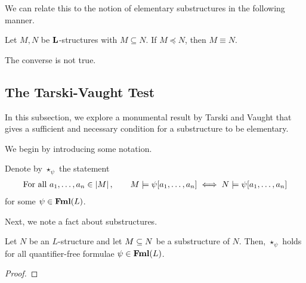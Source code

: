 We can relate this to the notion of elementary substructures in the following manner.

\begin{boxtheorem}
    Let $M, N$ be $\mathbf{L}$-structures with $M \subseteq N$. If $M \preceq N$, then $M \equiv N$.
\end{boxtheorem}

The converse is not true.

\begin{boxcexample}
    \sorry
\end{boxcexample}

\subsection{The Tarski-Vaught Test}

In this subsection, we explore a monumental result by Tarski and Vaught that gives a sufficient and necessary condition for a substructure to be elementary.

We begin by introducing some notation.

\begin{boxlnotation}
    Denote by $\star_{\psi}$ the statement
    \begin{align}
        \text{For all } a_1, \ldots, a_n \in \left\lvert M \right\rvert,
        \qquad
        M \models \psi\!\left[ a_1, \ldots, a_n \right]
        \iff
        N \models \psi\!\left[ a_1, \ldots, a_n \right]
    \end{align}
    for some $\psi \in \mathbf{Fml}(L)$.
\end{boxlnotation}

Next, we note a fact about substructures.

\begin{boxlemma}\label{Ch1:Lemma:Tarski-Vaught-star-psi}
    Let $N$ be an $L$-structure and let $M \subseteq N$ be a substructure of $N$. Then, $\star_{\psi}$ holds for all quantifier-free formulae $\psi \in \mathbf{Fml}(L)$.
\end{boxlemma}
\begin{proof}
    \sorry
\end{proof}


